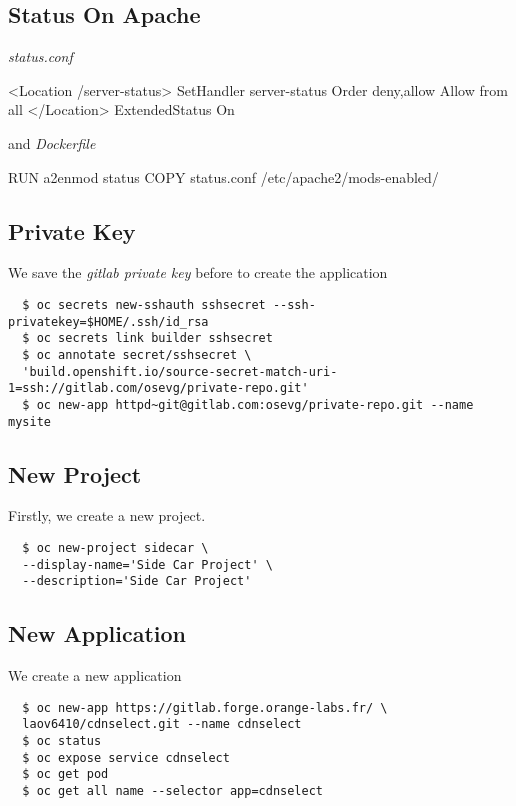 \subsection{Status On Apache}

\emph{status.conf}
\begin{apachecode*}{}
  <Location /server-status>
  SetHandler server-status
  Order deny,allow
  Allow from all
  </Location> ExtendedStatus On
\end{apachecode*}

and  \emph{Dockerfile}

\begin{dockercode*}{}
  RUN a2enmod status
  COPY status.conf /etc/apache2/mods-enabled/
\end{dockercode*}

\subsection{Private Key}

We save the \emph{gitlab private key} before to create the application

\begin{verbatim}
  $ oc secrets new-sshauth sshsecret --ssh-privatekey=$HOME/.ssh/id_rsa
  $ oc secrets link builder sshsecret
  $ oc annotate secret/sshsecret \
  'build.openshift.io/source-secret-match-uri-1=ssh://gitlab.com/osevg/private-repo.git'
  $ oc new-app httpd~git@gitlab.com:osevg/private-repo.git --name mysite
\end{verbatim}


\subsection{New Project}

Firstly, we create a new project.

\begin{verbatim}
  $ oc new-project sidecar \
  --display-name='Side Car Project' \
  --description='Side Car Project'
\end{verbatim}

\subsection{New Application}

We create a new application

\begin{verbatim}
  $ oc new-app https://gitlab.forge.orange-labs.fr/ \
  laov6410/cdnselect.git --name cdnselect
  $ oc status
  $ oc expose service cdnselect
  $ oc get pod
  $ oc get all name --selector app=cdnselect
\end{verbatim}